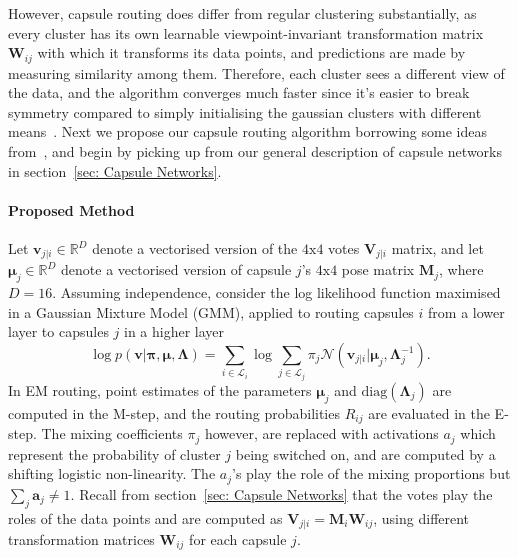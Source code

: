 \documentclass[letterpaper]{article} \usepackage{aaai20}  \usepackage{times}  \usepackage{helvet} \usepackage{courier}  \usepackage[hyphens]{url}  \usepackage{graphicx} \urlstyle{rm} \def\UrlFont{\rm}  \usepackage{graphicx}  \frenchspacing  \setlength{\pdfpagewidth}{8.5in}  \setlength{\pdfpageheight}{11in}  \nocopyright
\begin{document}
However, capsule routing does differ from regular clustering substantially, as every cluster has its own learnable viewpoint-invariant transformation matrix $\mathbf{W}_{ij}$ with which it transforms its data points, and predictions are made by measuring similarity among them. Therefore, each cluster sees a different view of the data, and the algorithm converges much faster since it's easier to break symmetry compared to simply initialising the gaussian clusters with different means~\cite{hinton2018matrix}. Next we propose our capsule routing algorithm borrowing some ideas from~\cite{bishop2006pattern}, and begin by picking up from our general description of capsule networks in section~\ref{sec: Capsule Networks}. 
\paragraph{Proposed Method}
Let $\mathbf{v}_{j|i} \in \mathbb{R}^{D}$ denote a vectorised version of the $4\text{x}4$ votes $\mathbf{V}_{j|i}$ matrix, and let $\boldsymbol{\mu}_j \in \mathbb{R}^{D}$ denote a vectorised version of capsule $j$'s $4\text{x}4$ pose matrix $\mathbf{M}_j$, where $D=16$. Assuming independence, consider the log likelihood function maximised in a Gaussian Mixture Model (GMM), applied to routing capsules $i$ from a lower layer to capsules $j$ in a higher layer
\begin{equation}
    \log p(\mathbf{v}|\boldsymbol{\pi},\boldsymbol{\mu},\boldsymbol{\Lambda}) = \sum_{i \in \mathcal{L}_i} \log \sum_{j\in \mathcal{L}_j}\pi_j \mathcal{N}(\mathbf{v}_{j|i}|\boldsymbol{\mu}_j,\boldsymbol{\Lambda}_j^{-1}).
\end{equation}
In EM routing, point estimates of the parameters $\boldsymbol{\mu}_j$ and $\mathrm{diag}(\boldsymbol{\Lambda}_{j})$ are computed in the M-step, and the routing probabilities $R_{ij}$ are evaluated in the E-step. The mixing coefficients $\pi_j$ however, are replaced with activations $a_j$ which represent the probability of cluster $j$ being switched on, and are computed by a shifting logistic non-linearity. The $a_j$'s play the role of the mixing proportions but $\sum_j \mathbf{a}_j \neq 1$. Recall from section~\ref{sec: Capsule Networks} that the votes play the roles of the data points and are computed as $\mathbf{V}_{j|i} = \mathbf{M}_{i}\mathbf{W}_{ij}$, using different transformation matrices 
$\mathbf{W}_{ij}$ for each capsule $j$.
\end{document}

